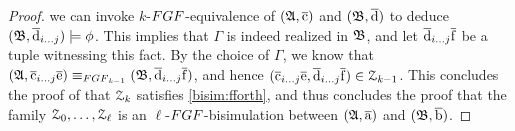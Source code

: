 \begin{proof}
we can invoke $\mathit{k}$-$\FGF$-equivalence of $({\mathfrak{A}}, \overline{\mathrm{c}})$ and $({\mathfrak{B}}, \overline{\mathrm{d}})$ to deduce~$({\mathfrak{B}}, \overline{\mathrm{d}}_{i\ldots j}) \models \phi$.
This implies that $\Gamma$ is indeed realized in ${\mathfrak{B}}$, and let $\overline{\mathrm{d}}_{i\ldots j}\overline{\mathrm{f}}$ be a tuple witnessing this fact.
By the choice of $\Gamma$, we know that  $(\str{A}, \elemtuplecfromto{i}{j}\elemtuplee) \equiv_{\FGF_{\mathit{k}{-}1}} (\str{B}, \elemtupledfromto{i}{j}\elemtuplef)$, and hence
$(\overline{\mathrm{c}}_{i\ldots j}\overline{\mathrm{e}}, \overline{\mathrm{d}}_{i\ldots j}\overline{\mathrm{f}}) \in \mathcal{Z}_{\mathit{k}{-}1}$. 
This concludes the proof of that $\mathcal{Z}_{\mathit{k}}$ satisfies \ref{bisim:fforth}, and thus concludes the proof that the family $\mathcal{Z}_0, \ldots, \mathcal{Z}_\ell$ is an $\ell$-$\FGF$-bisimulation between $({\mathfrak{A}}, \overline{\mathrm{a}})$ and $({\mathfrak{B}}, \overline{\mathrm{b}})$.
\end{proof}
